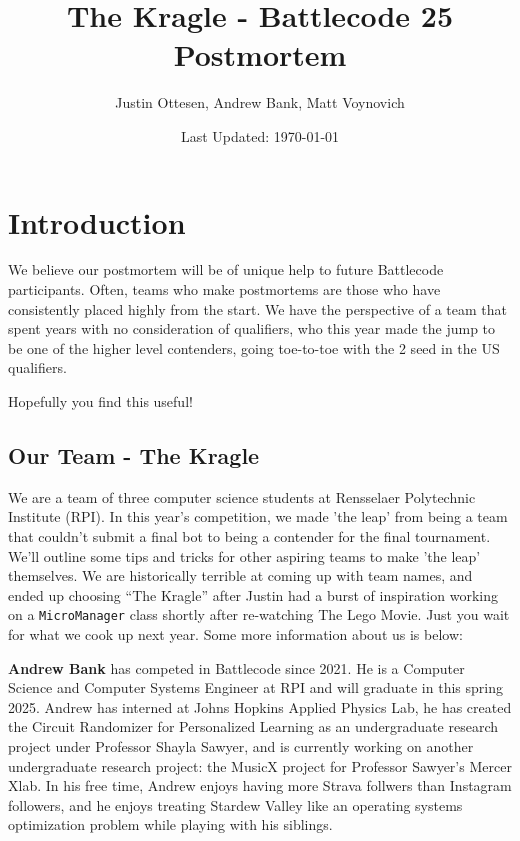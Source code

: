 \documentclass{article}
\title{The Kragle - Battlecode 25 Postmortem}
\author{Justin Ottesen, Andrew Bank, Matt Voynovich}
\date{Last Updated: \today}
\begin{document}
  \maketitle

  \section{Introduction}  

  We believe our postmortem will be of unique help to future Battlecode participants. Often, teams who make postmortems are those who have consistently placed highly from the start. We have the perspective of a team that spent years with no consideration of qualifiers, who this year made the jump to be one of the higher level contenders, going toe-to-toe with the 2 seed in the US qualifiers.

  \medskip

  Hopefully you find this useful!

  \subsection{Our Team - The Kragle}

  We are a team of three computer science students at Rensselaer Polytechnic Institute (RPI). In this year's competition, we made 'the leap' from being a team that couldn't submit a final bot to being a contender for the final tournament. We'll outline some tips and tricks for other aspiring teams to make 'the leap' themselves. We are historically terrible at coming up with team names, and ended up choosing ``The Kragle'' after Justin had a burst of inspiration working on a \verb|MicroManager| class shortly after re-watching The Lego Movie. Just you wait for what we cook up next year. Some more information about us is below:
  
  \medskip

  \textbf{Andrew Bank} has competed in Battlecode since 2021. He is a Computer Science and Computer Systems Engineer at RPI and will graduate in this spring 2025. Andrew has interned at Johns Hopkins Applied Physics Lab, he has created the Circuit Randomizer for Personalized Learning as an undergraduate research project under Professor Shayla Sawyer, and is currently working on another undergraduate research project: the MusicX project for Professor Sawyer's Mercer Xlab. In his free time, Andrew enjoys having more Strava follwers than Instagram followers, and he enjoys treating Stardew Valley like an operating systems optimization problem while playing with his siblings.
\end{document}

